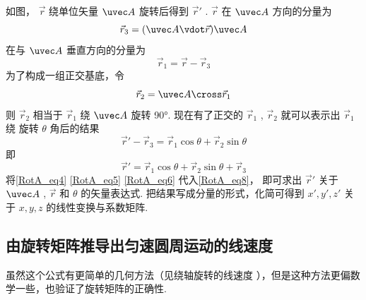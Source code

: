 如图， $\vec r$ 绕单位矢量 $\uvec A$ 旋转后得到 $\vec r'$ .  $\vec r$ 在 $\uvec A$ 方向的分量为   
\begin{equation}\label{RotA_eq4}
\vec r_3 = (\uvec A \vdot \vec r)\uvec A
\end{equation}
在与 $\uvec A$ 垂直方向的分量为
\begin{equation}\label{RotA_eq5}
\vec r_1 = \vec r - \vec r_3
\end{equation}
为了构成一组正交基底，令
\begin{equation}\label{RotA_eq6}
\vec r_2 = \uvec A \cross \vec r_1
\end{equation}
则 $\vec r_2$ 相当于 $\vec r_1$ 绕 $\uvec A$ 旋转 90°. 现在有了正交的 $\vec r_1$ , $\vec r_2$  就可以表示出 $\vec r_1$ 绕 旋转 $\theta $ 角后的结果
\begin{equation}
\vec r' - \vec r_3 = \vec r_1\cos \theta  + \vec r_2\sin \theta
\end{equation}
即
\begin{equation}\label{RotA_eq8}
\vec r' = \vec r_1\cos \theta  + \vec r_2\sin \theta  + \vec r_3
\end{equation} 
将\autoref{RotA_eq4} \autoref{RotA_eq5} \autoref{RotA_eq6} 代入\autoref{RotA_eq8}， 即可求出 $\vec r'$ 关于 $\uvec A$ , $\vec r$ 和 $\theta $ 的矢量表达式. 把结果写成分量的形式，化简可得到 $x',y',z'$ 关于 $x,y,z$ 的线性变换与系数矩阵.

\subsection{由旋转矩阵推导出匀速圆周运动的线速度} 

虽然这个公式有更简单的几何方法（见绕轴旋转的线速度%
），但是这种方法更偏数学一些，也验证了旋转矩阵的正确性.

